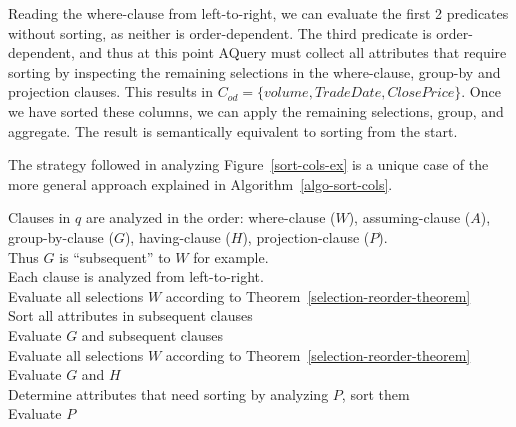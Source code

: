 \documentclass{acm_proc_article-sp}
\makeatletter
\newenvironment{Ualgorithm}[1][htpb]
  {\def\@algocf@post@ruled{\kern\interspacealgoruled\hrule  height\algoheightrule\kern3pt\relax}%
    \def\@algocf@capt@ruled{under}
    \begin{algorithm}[#1]}
  {\end{algorithm}}
\makeatother
\begin{document}
Reading the where-clause from left-to-right, we can evaluate the first 2 predicates without sorting, as neither is
order-dependent. The third predicate is 
order-dependent, and thus at this point AQuery must collect all attributes that require sorting by inspecting the remaining selections in the where-clause, group-by and projection clauses. This results in $C_{od}=\{volume, TradeDate, ClosePrice\}$. Once we have sorted these columns, we can apply the remaining selections,
group, and aggregate. The result is semantically equivalent to sorting from the start.

The strategy followed in analyzing Figure~\ref{sort-cols-ex} is a unique case of the more general approach
explained in Algorithm~\ref{algo-sort-cols}.

\begin{Ualgorithm}
  Clauses in $q$ are analyzed in the order: where-clause ($W$), assuming-clause ($A$), group-by-clause ($G$), having-clause ($H$), projection-clause ($P$). \\
  Thus $G$ is ``subsequent'' to  $W$ for example.\\
  
  Each clause is analyzed from left-to-right. \\
  
   {
  	Evaluate all selections $W$ according to Theorem~\ref{selection-reorder-theorem}\\
  	Sort all attributes in subsequent clauses\\
  	Evaluate $G$ and subsequent clauses \\
  	}
   {
  	Evaluate all selections $W$ according to Theorem~\ref{selection-reorder-theorem}\\
  	Evaluate $G$ and $H$ \\
  	Determine attributes that need sorting by analyzing $P$, sort them \\
  	Evaluate $P$ \\
   	}
   


\end{Ualgorithm}
\end{document}
